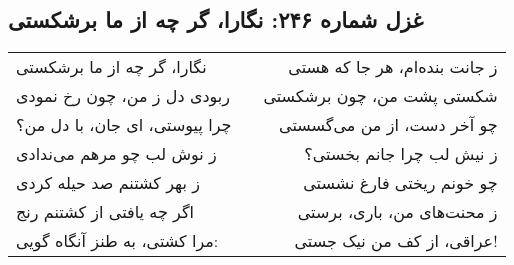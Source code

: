 \begin{center}
\section*{غزل شماره ۲۴۶: نگارا، گر چه از ما برشکستی}
\label{sec:246}
\begin{longtable}{l p{0.5cm} r}
نگارا، گر چه از ما برشکستی
&&
ز جانت بنده‌ام، هر جا که هستی
\\
ربودی دل ز من، چون رخ نمودی
&&
شکستی پشت من، چون برشکستی
\\
چرا پیوستی، ای جان، با دل من؟
&&
چو آخر دست، از من می‌گسستی
\\
ز نوش لب چو مرهم می‌ندادی
&&
ز نیش لب چرا جانم بخستی؟
\\
ز بهر کشتنم صد حیله کردی
&&
چو خونم ریختی فارغ نشستی
\\
اگر چه یافتی از کشتنم رنج
&&
ز محنت‌های من، باری، برستی
\\
مرا کشتی، به طنز آنگاه گویی:
&&
عراقی، از کف من نیک جستی!
\\
\end{longtable}
\end{center}
